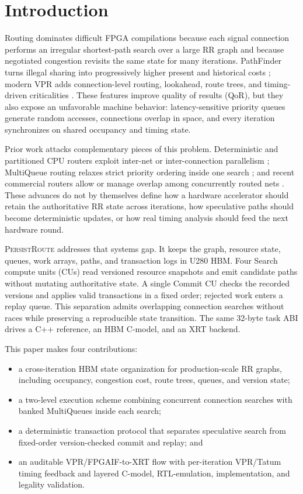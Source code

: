\documentclass[sigconf,anonymous,review]{acmart}
\newcommand{\system}{\textsc{PersistRoute}}
\begin{document}
\section{Introduction}

Routing dominates difficult FPGA compilations because each signal connection
performs an irregular shortest-path search over a large RR graph and because
negotiated congestion revisits the same state for many iterations. PathFinder
turns illegal sharing into progressively higher present and historical costs
\cite{mcmurchie1995pathfinder}; modern VPR adds connection-level routing,
lookahead, route trees, and timing-driven criticalities \cite{vtr8}. These
features improve quality of results (QoR), but they also expose an unfavorable
machine behavior: latency-sensitive priority queues generate random accesses,
connections overlap in space, and every iteration synchronizes on shared
occupancy and timing state.

Prior work attacks complementary pieces of this problem. Deterministic and
partitioned CPU routers exploit inter-net or inter-connection parallelism
\cite{moctar2018galois,zhou2020connection}; MultiQueue routing relaxes strict
priority ordering inside one search \cite{singer2024multiqueue}; and recent
commercial routers allow or manage overlap among concurrently routed nets
\cite{zang2024cufr,zang2024potter}. These advances do not by themselves define
how a hardware accelerator should retain the authoritative RR state across
iterations, how speculative paths should become deterministic updates, or how
real timing analysis should feed the next hardware round.

\system{} addresses that systems gap. It keeps the graph, resource state,
queues, work arrays, paths, and transaction logs in U280 HBM. Four Search
compute units (CUs) read versioned resource snapshots and emit candidate paths
without mutating authoritative state. A single Commit CU checks the recorded
versions and applies valid transactions in a fixed order; rejected work enters
a replay queue. This separation admits overlapping connection searches without
races while preserving a reproducible state transition. The same 32-byte task
ABI drives a C++ reference, an HBM C-model, and an XRT backend.

This paper makes four contributions:
\begin{itemize}
 \item a cross-iteration HBM state organization for production-scale RR graphs,
 including occupancy, congestion cost, route trees, queues, and version state;
 \item a two-level execution scheme combining concurrent connection searches
 with banked MultiQueues inside each search;
 \item a deterministic transaction protocol that separates speculative search
 from fixed-order version-checked commit and replay; and
 \item an auditable VPR/FPGAIF-to-XRT flow with per-iteration VPR/Tatum timing
 feedback and layered C-model, RTL-emulation, implementation, and legality
 validation.
\end{itemize}
\end{document}
